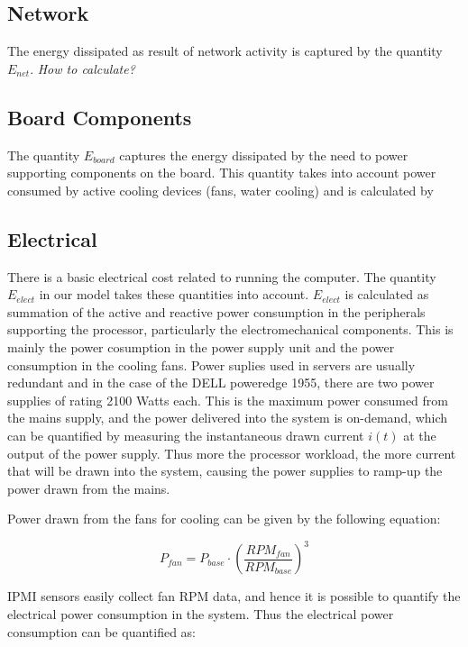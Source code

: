 \documentclass[times, 10pt,onecolumn]{article}
\begin{document}
\subsection{Network}
\label{sec:networkengery}
The energy dissipated as result of network activity is captured by the
quantity $E_{net}$.   \textit{How to calculate?}

\subsection{Board Components}
\label{sec:board}
The quantity $E_{board}$ captures the energy dissipated by the need to
power supporting components on the board.  This quantity takes into
account power consumed by active cooling devices (fans, water cooling)
and is calculated by

\subsection{Electrical}
\label{sec:electrical}
There is a basic electrical cost related to running the computer. The
quantity $E_{elect}$ in our model takes these quantities into account.
$E_{elect}$ is calculated as summation of the active and reactive power
consumption in the peripherals supporting the processor, particularly
the electromechanical components. This is mainly the power cosumption in
the power supply unit and the power consumption in the cooling fans.
Power suplies used in servers are usually redundant and in the case of
the DELL poweredge 1955, there are two power supplies of rating 2100
Watts each. This is the maximum power consumed from the mains supply,
and the power delivered into the system is on-demand, which can be
quantified by measuring the instantaneous drawn current $i(t)$ at the
output of the power supply. Thus more the processor workload, the more
current that will be drawn into the system, causing the power supplies
to ramp-up the power drawn from the mains.

Power drawn from the fans for cooling can be given by the following equation:

\begin{equation}
\label{eq:fanp}
P_{fan}=  P_{base} \cdot (\frac{RPM_{fan}}{RPM_{base}})^3
\end{equation} 

IPMI sensors easily collect fan RPM data, and hence it is possible to
quantify the electrical power consumption in the system. Thus the
electrical power consumption can be quantified as:
\end{document}
